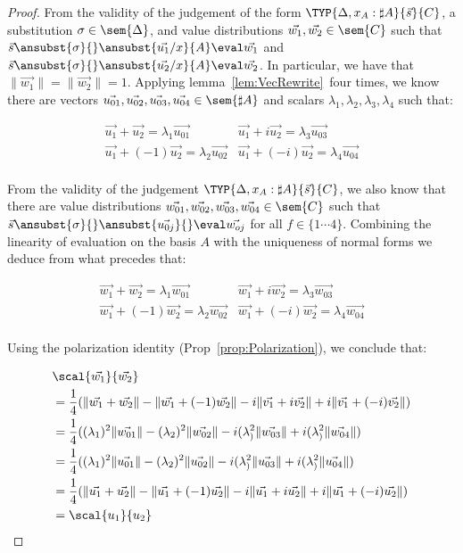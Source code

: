 \begin{proof}
    From the validity of the judgement of the form $\TYP{\Delta, x_A:\sharp A}{\vec{s}}{C}$, a substitution $\sigma\in\sem{\Delta}$, and value distributions $\vec{w_1},\vec{w_2}\in\sem{C}$ such that $\vec{s}\ansubst{\sigma}{}\ansubst{\vec{u_1}/x}{A}\eval\vec{w_1}$ and $\vec{s}\ansubst{\sigma}{}\ansubst{\vec{u_2}/x}{A}\eval\vec{w_2}$. In particular, we have that $\|\vec{w_1}\| = \|\vec{w_2}\|=1$. Applying lemma~\ref{lem:VecRewrite}~four times, we know there are vectors $\vec{u_{01}},\vec{u_{02}},\vec{u_{03}},\vec{u_{04}}\in\sem{\sharp A}$ and scalars $\lambda_1,\lambda_2,\lambda_3,\lambda_4$ such that:
    
    \begin{align*}
        \vec{u_1} + \vec{u_2} = \lambda_1 \vec{u_{01}} & \vec{u_1} + i \vec{u_2} = \lambda_3 \vec{u_{03}} \\
        \vec{u_1} + (-1) \vec{u_2} = \lambda_2 \vec{u_{02}} & \vec{u_1} + (-i) \vec{u_2} = \lambda_4 \vec{u_{04}} \\
    \end{align*}

    From the validity of the judgement  $\TYP{\Delta, x_A:\sharp A}{\vec{s}}{C}$, we also know that there are value distributions $\vec{w_{01}},\vec{w_{02}},\vec{w_{03}},\vec{w_{04}}\in\sem{C}$ such that $\vec{s}\ansubst{\sigma}{}\ansubst{\vec{u_{0j}}}{}\eval\vec{w_{oj}}$ for all $f\in\{1\dotsb 4\}$. Combining the linearity of evaluation on the basis $A$ with the uniqueness of normal forms we deduce from what precedes that:

    \begin{align*}
        \vec{w_1} + \vec{w_2} = \lambda_1 \vec{w_{01}} & \vec{w_1} + i \vec{w_2} = \lambda_3 \vec{w_{03}} \\
        \vec{w_1} + (-1) \vec{w_2} = \lambda_2 \vec{w_{02}} & \vec{w_1} + (-i) \vec{w_2} = \lambda_4 \vec{w_{04}} \\
    \end{align*}

    Using the polarization identity (Prop~\ref{prop:Polarization}), we conclude that:

    \begin{align*}
        &\scal{\vec{w_1}}{\vec{w_2}}\\
        &= \frac{1}{4}(\|\vec{w_1}+\vec{w_2}\| - \|\vec{w_1} + (-1)\vec{w_2}\| - i \|\vec{v_1} + i \vec{v_2}\| + i \|\vec{v_1} + (-i) \vec{v_2}\|)\\
        &= \frac{1}{4}((\lambda_1)^2\|\vec{w_{01}}\| - (\lambda_2)^2\|\vec{w_{02}}\| - i (\lambda_)^2 \|\vec{w_{03}}\| + i (\lambda_)^2\|\vec{w_{04}}\|)\\
        &= \frac{1}{4}((\lambda_1)^2\|\vec{u_{01}}\| - (\lambda_2)^2\|\vec{u_{02}}\| - i (\lambda_)^2 \|\vec{u_{03}}\| + i (\lambda_)^2\|\vec{u_{04}}\|)\\
        &= \frac{1}{4}(\|\vec{u_1}+\vec{u_2}\| - \|\vec{u_1} + (-1)\vec{u_2}\| - i \|\vec{u_1} + i \vec{u_2}\| + i \|\vec{u_1} + (-i) \vec{u_2}\|)\\
        &=\scal{u_1}{u_2}
    \end{align*}

\end{proof}

